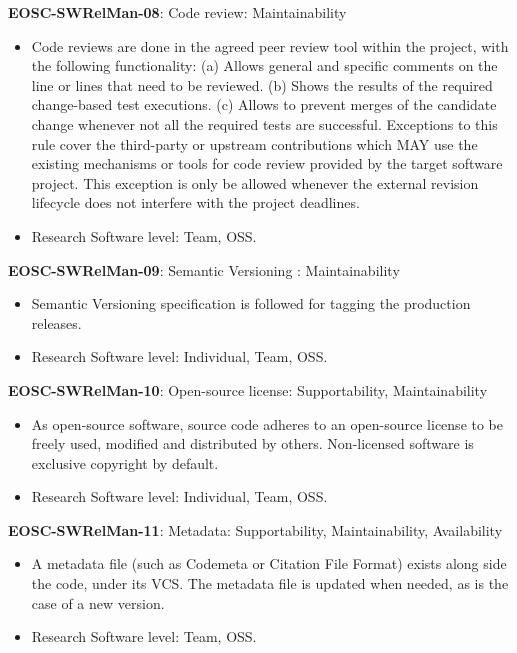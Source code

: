 \textbf{EOSC-SWRelMan-08}: Code review: Maintainability

\begin{itemize}
    \item Code reviews are done in the agreed peer review tool within the project, with the following  functionality: (a) Allows general and specific comments on the line or lines that need to be reviewed. (b) Shows the results of the required change-based test executions. (c) Allows to prevent merges of the candidate change whenever not all the required tests are successful. Exceptions to this rule cover the third-party or upstream contributions which MAY use the existing mechanisms or tools for code review provided by the target software project. This exception is only be allowed whenever the external revision lifecycle does not interfere with the project deadlines. \cite{srisopha_software_2018,aberdour_achieving_2007,zuser_software_2005,orviz_set_2017}
    \item Research Software level: Team, OSS.
\end{itemize}

\textbf{EOSC-SWRelMan-09}: Semantic Versioning : Maintainability

\begin{itemize}
    \item Semantic Versioning specification is followed for tagging the production releases. \cite{orviz_set_2017,raymond_software_2013}
    \item Research Software level: Individual, Team, OSS.
\end{itemize}

\textbf{EOSC-SWRelMan-10}: Open-source license: Supportability, Maintainability

\begin{itemize}
    \item As open-source software, source code adheres to an open-source license to be freely used, modified and distributed by others. Non-licensed software is exclusive copyright by default. \cite{orviz_set_2017,raymond_software_2013}
    \item Research Software level: Individual, Team, OSS.
\end{itemize}

\textbf{EOSC-SWRelMan-11}: Metadata: Supportability, Maintainability, Availability

\begin{itemize}
    \item A metadata file (such as Codemeta or Citation File Format) exists along side the code, under its VCS. The metadata file is updated when needed, as is the case of a new version. \cite{orviz_set_2017}
    \item Research Software level: Team, OSS.
\end{itemize}

